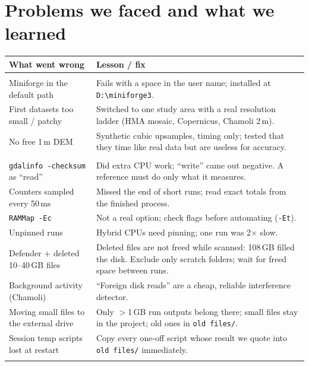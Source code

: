 ﻿\documentclass[11pt,a4paper]{article}
\newcommand{\code}[1]{\texttt{#1}}
\begin{document}
\section{Problems we faced and what we learned}\label{sec:problems}
\begin{longtable}{>{\raggedright\arraybackslash}p{5.2cm}>{\raggedright\arraybackslash}p{10.2cm}}
\toprule
What went wrong & Lesson / fix \\
\midrule
\endhead
\multicolumn{2}{l}{\textit{Setup and data}} \\
Miniforge in the default path & Fails with a space in the user name; installed at \code{D:\textbackslash miniforge3}. \\
First datasets too small / patchy & Switched to one study area with a real resolution ladder (HMA mosaic, Copernicus, Chamoli 2\,m). \\
No free 1\,m DEM & Synthetic cubic upsamples, timing only; tested that they time like real data but are useless for accuracy. \\
\midrule
\multicolumn{2}{l}{\textit{Phase 2 benchmarking}} \\
\code{gdalinfo -checksum} as ``read'' & Did extra CPU work; ``write'' came out negative. A reference must do only what it measures. \\
Counters sampled every 50\,ms & Missed the end of short runs; read exact totals from the finished process. \\
\code{RAMMap -Ec} & Not a real option; check flags before automating (\code{-Et}). \\
Unpinned runs & Hybrid CPUs need pinning; one run was 2$\times$ slow. \\
Defender + deleted 10--40\,GB files & Deleted files are not freed while scanned: 108\,GB filled the disk. Exclude only scratch
folders; wait for freed space between runs. \\
Background activity (Chamoli) & ``Foreign disk reads'' are a cheap, reliable interference detector. \\
Moving small files to the external drive & Only $>$1\,GB run outputs belong there; small files stay in the project; old ones in
\code{old files/}. \\
Session temp scripts lost at restart & Copy every one-off script whose result we quote into \code{old files/} immediately. \\
\midrule
\multicolumn{2}{l}{\textit{Phase 3 engine}} \\

\end{longtable}
\end{document}

